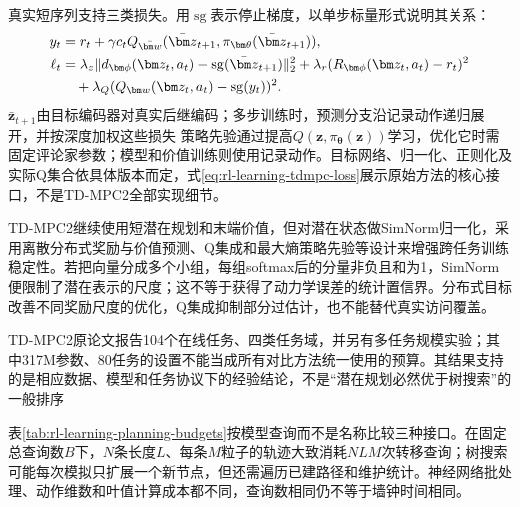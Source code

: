 真实短序列支持三类损失。用$\operatorname{sg}$表示停止梯度，以单步标量形式说明其关系：
\begin{align}
  y_t&=r_t+\gamma c_t
      Q_{\bar{\bm w}}(\bar{\bm z}_{t+1},
                             \pi_{\bm\theta}(\bar{\bm z}_{t+1})), \notag\\
  \ell_t&=\lambda_z\|
        d_{\bm\phi}(\bm z_t,a_t)-\operatorname{sg}(\bar{\bm z}_{t+1})
                              \|_2^2
       +\lambda_r(R_{\bm\phi}(\bm z_t,a_t)-r_t)^2 \notag\\
       &\quad+\lambda_Q(Q_{\bm w}(\bm z_t,a_t)
                                      -\operatorname{sg}(y_t))^2.
  \label{eq:rl-learning-tdmpc-loss}
\end{align}
$\bar{\bm z}_{t+1}$由目标编码器对真实后继编码；多步训练时，预测分支沿记录动作递归展开，并按深度加权这些损失
策略先验通过提高$Q(\bm z,\pi_{\bm\theta}(\bm z))$学习，优化它时需固定评论家参数；模型和价值训练则使用记录动作。目标网络、归一化、正则化及实际Q集合依具体版本而定，式\eqref{eq:rl-learning-tdmpc-loss}展示原始方法的核心接口，不是TD-MPC2全部实现细节。

TD-MPC2继续使用短潜在规划和末端价值，但对潜在状态做SimNorm归一化，采用离散分布式奖励与价值预测、Q集成和最大熵策略先验等设计来增强跨任务训练稳定性。若把向量分成多个小组，每组softmax后的分量非负且和为1，SimNorm便限制了潜在表示的尺度；这不等于获得了动力学误差的统计置信界。分布式目标改善不同奖励尺度的优化，Q集成抑制部分过估计，也不能替代真实访问覆盖。

TD-MPC2原论文报告104个在线任务、四类任务域，并另有多任务规模实验；其中317M参数、80任务的设置不能当成所有对比方法统一使用的预算。其结果支持的是相应数据、模型和任务协议下的经验结论，不是“潜在规划必然优于树搜索”的一般排序

表\ref{tab:rl-learning-planning-budgets}按模型查询而不是名称比较三种接口。在固定总查询数$B$下，$N$条长度$L$、每条$M$粒子的轨迹大致消耗$NLM$次转移查询；树搜索可能每次模拟只扩展一个新节点，但还需遍历已建路径和维护统计。神经网络批处理、动作维数和叶值计算成本都不同，查询数相同仍不等于墙钟时间相同。

